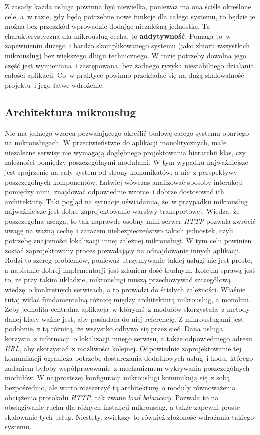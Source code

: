Z zasady każda usługa powinna być niewielka, ponieważ ma ona ściśle określone cele, a~w razie, gdy będą potrzebne nowe funkcje dla całego systemu, to będzie je można bez przeszkód wprowadzić dodając niezależną jednostkę. Ta charakterystyczna dla mikrousług cecha, to \textbf{addytywność}. Pomaga to~w zapewnieniu dużego~i bardzo skomplikowanego systemu (jako zbioru wszystkich mikrousług) bez większego długu technicznego\cite{Rodger:2019}. W razie potrzeby dowolna jego część jest wymieniana~i zastępowana, bez żadnego ryzyka niestabilnego działania całości aplikacji. Co~w praktyce powinno przekładać się na dużą skalowalność projektu~i jego łatwe wdrożenie\cite{Ziade:2018}.

\subsection{Architektura mikrousług}
Nie ma jednego wzorca pozwalającego określić budowę całego systemu opartego na mikrousługach. W przeciwieństwie do aplikacji monolitycznych, małe niezależne serwisy nie wymagają dogłębnego projektowania hierarchii klas, czy zależności pomiędzy poszczególnymi modułami. W tym wypadku najważniejsze jest spojrzenie na cały system od strony komunikatów, a nie~z perspektywy poszczególnych komponentów. Łatwiej wówczas analizować sposoby interakcji pomiędzy nimi, znajdować odpowiednie wzorce~i dobrze dostosować ich architekturę\cite{Rodger:2019}. Taki pogląd na sytuacje uświadamia, że~w przypadku mikrousług najważniejsze jest dobre zaprojektowanie warstwy transportowej. Wiedza, że poszczególna usługa, to tak naprawdę osobny mini serwer \textit{HTTP} pozwala zwrócić uwagę na ważną cechę~i zarazem niebezpieczeństwo takich jednostek, czyli potrzebę znajomości lokalizacji innej zależnej mikrousługi. W tym celu powinien zostać zaprojektowany proces pozwalający na odnajdowanie innych aplikacji. Rodzi to szereg problemów, ponieważ utrzymywanie takiej usługi nie jest proste, a napisanie dobrej implementacji jest zdaniem dość trudnym\cite{Rodger:2019}. Kolejną sprawą jest to, że przy takim układzie, mikrousługi muszą przechowywać szczegółową wiedzę~o konkretnych serwisach, a to prowadzi do ścisłych zależności. Właśnie tutaj widać fundamentalną różnicę między architekturą mikrousług, a monolitu. Żeby jednolita centralna aplikacja~w którymś~z modułów skorzystała~z metody danej klasy ważne jest, aby posiadała do niej referencję. Z mikrousługami jest podobnie, z tą różnicą, że wszystko odbywa się przez sieć. Dana usługa korzysta~z informacji~o lokalizacji innego serwisu, a także odpowiedniego adresu \textit{URL}, aby skorzystać~z możliwości kolejnej. Odpowiednie zaprojektowanie tej komunikacji ogranicza potrzebę dostarczania dodatkowych usług~i kodu, którego zadaniem byłoby współpracowanie~z mechanizmem wykrywania poszczególnych modułów\cite{Rodger:2019}.
\newpage
W najprostszej konfiguracji mikrousługi komunikują się~z sobą bezpośrednio, ale warto rozszerzyć tą architekturę~o moduły równoważenia obciążenia protokołu \textit{HTTP}, tak zwane \textit{load balancery}. Pozwala to na obsługiwanie ruchu dla różnych instancji mikrousług, a także zapewni proste skalowanie tych usług\cite{Rodger:2019}. Niestety, zwiększy to również złożoność wdrażania takiego systemu.

